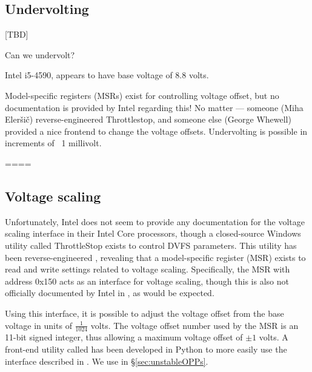 \subsection{Undervolting}

[TBD]

Can we undervolt?

Intel i5-4590, appears to have base voltage of 8.8 volts.

Model-specific registers (MSRs) exist for controlling voltage offset, but no
documentation is provided by Intel regarding this!
No matter — someone (Miha Eleršič) reverse-engineered Throttlestop, and someone
else (George Whewell) provided a nice frontend to change the voltage offsets.
Undervolting is possible in increments of ~1 millivolt.

====

\subsection{Voltage scaling}

Unfortunately, Intel does not seem to provide any documentation for the voltage
scaling interface in their Intel Core processors, though a closed-source
Windows utility called ThrottleStop \cite{throttlestop} exists to control DVFS
parameters. This utility has been reverse-engineered \cite{elersicDoc},
revealing that a model-specific register (MSR) exists to read and write settings
related to voltage scaling. Specifically, the MSR with address 0x150 acts as an
interface for voltage scaling, though this is also not officially documented by
Intel in \cite[Volume 4, §2.13]{intelDevManual}, as would be expected.

Using this interface, it is possible to adjust the voltage offset from the base
voltage in units of $\frac{1}{1024}$ volts. The voltage offset number used by
the MSR is an 11-bit signed integer, thus allowing a maximum voltage offset of
$\pm{1}$ volts. A front-end utility called  \cite{whewellUndervolt}
has been developed in Python to more easily use the interface described in
\cite{elersicDoc}. We use  in §\ref{sec:unstableOPPs}.
